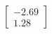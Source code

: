\documentclass[preview]{standalone}
\begin{document}
\begin{align*}
\begin{bmatrix} -2.69 \\ 1.28 \end{bmatrix}
\end{align*}
\end{document}
